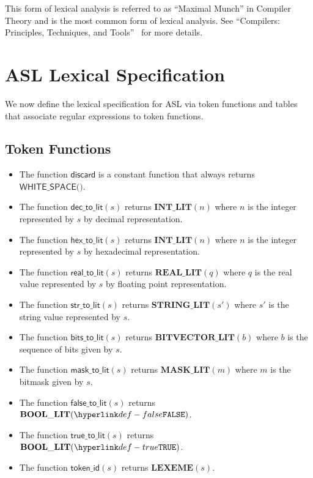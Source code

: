 \documentclass{book}
\newcommand\terminal[1]{\mathtt{\mathbf{#1}}}
\newcommand\Tstringlit[0]{\terminal{STRING\_LIT}}
\newcommand\Tmasklit[0]{\terminal{MASK\_LIT}}
\newcommand\Tbitvectorlit[0]{\terminal{BITVECTOR\_LIT}}
\newcommand\Tintlit[0]{\terminal{INT\_LIT}}
\newcommand\Treallit[0]{\terminal{REAL\_LIT}}
\newcommand\Tboollit[0]{\terminal{BOOL\_LIT}}
\newcommand\Tlexeme[0]{\terminal{LEXEME}}
\newcommand\discard[0]{\textsf{discard}}
\newcommand\decimaltolit[0]{\textsf{dec\_to\_lit}}
\newcommand\hextolit[0]{\textsf{hex\_to\_lit}}
\newcommand\realtolit[0]{\textsf{real\_to\_lit}}
\newcommand\strtolit[0]{\textsf{str\_to\_lit}}
\newcommand\bitstolit[0]{\textsf{bits\_to\_lit}}
\newcommand\masktolit[0]{\textsf{mask\_to\_lit}}
\newcommand\truetolit[0]{\textsf{true\_to\_lit}}
\newcommand\falsetolit[0]{\textsf{false\_to\_lit}}
\newcommand\tokenid[0]{\textsf{token\_id}}
\newcommand\Twhitespace[0]{\textsf{WHITE\_SPACE()}}
\begin{document}
This form of lexical analysis is referred to as ``Maximal Munch'' in Compiler Theory
and is the most common form of lexical analysis.
See ``Compilers: Principles, Techniques, and Tools''~\cite{ASU86} for more details.

\section{ASL Lexical Specification}
We now define the lexical specification for ASL via token functions and tables
that associate regular expressions to token functions.

\subsection{Token Functions}
\begin{itemize}
\item The function $\discard$ is a constant function that always returns $\Twhitespace$.

\item The function $\decimaltolit(s)$ returns $\Tintlit(n)$ where $n$ is the integer represented by $s$
by decimal representation.

\item The function $\hextolit(s)$ returns $\Tintlit(n)$ where $n$ is the integer represented by $s$
by hexadecimal representation.

\item The function $\realtolit(s)$ returns $\Treallit(q)$ where $q$ is the real value represented by $s$
by floating point representation.

\item The function $\strtolit(s)$ returns $\Tstringlit(s')$ where $s'$ is the string value represented by $s$.

\item The function $\bitstolit(s)$ returns $\Tbitvectorlit(b)$ where $b$ is the sequence of bits
given by $s$.

\item The function $\masktolit(s)$ returns $\Tmasklit(m)$ where $m$ is the bitmask given by $s$.

\item The function $\falsetolit(s)$ returns $\Tboollit(\False)$.

\item The function $\truetolit(s)$ returns $\Tboollit(\True)$.

\item The function $\tokenid(s)$ returns $\Tlexeme(s)$.
\end{itemize}
\end{document}
